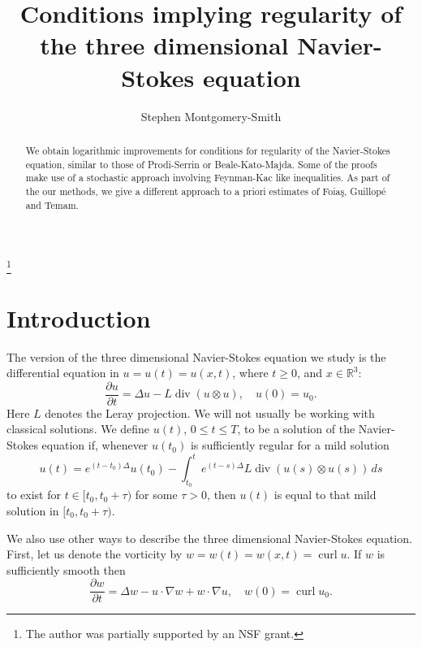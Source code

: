 \documentclass[12pt]{amsart}
\theoremstyle{remark}
\newcommand{\R}{{\mathbb R}}
\DeclareMathOperator{\curl}{curl}
\DeclareMathOperator{\divergence}{div}
\begin{document}
\title[Regularity of Navier-Stokes]
{Conditions implying regularity of the three dimensional Navier-Stokes
equation}
\author{Stephen Montgomery-Smith}
\makeatletter
\address{Department of Mathematics,
University of Missouri,
Columbia, MO 65211}
\thanks{The author was
partially supported
by an NSF grant.}

\begin{abstract}
We obtain logarithmic improvements for 
conditions for regularity of the
Navier-Stokes equation, similar to those of Prodi-Serrin or
Beale-Kato-Majda.  
Some of the proofs make use
of a stochastic approach involving Feynman-Kac like inequalities.
As part of the our methods, we give a different approach to a priori estimates
of Foia\c s, Guillop\'e and Temam.
\end{abstract}

\maketitle

\section{Introduction}

The version of the three dimensional
Navier-Stokes equation we study is the
differential equation in
$u = u(t) = u(x,t)$, where $ t\ge 0$, and $x \in \R^3$:
$$ \frac{\partial u}{\partial t}
   = \Delta u - L\divergence(u \otimes u),
   \quad u(0) = u_0.$$
Here $L$ denotes the Leray projection.
We will not usually be working with classical solutions.  We define
$u(t)$, $0 \le t \le T$,
to be a solution of the Navier-Stokes equation if, whenever $u(t_0)$ is 
sufficiently regular for a mild solution
$$ u(t) = e^{(t-t_0)\Delta} u(t_0) - \int_{t_0}^t
   e^{(t-s)\Delta} L\divergence(u(s) \otimes u(s)) \, ds $$   
to exist for 
$t \in [t_0,t_0+\tau)$ for some $\tau>0$, 
then $u(t)$ is equal to that mild solution in $[t_0,t_0+\tau)$.

We also use other ways to describe the three dimensional
Navier-Stokes equation.  First, let us 
denote the vorticity by $w = w(t) = w(x,t) = \curl u$.
If $w$ is sufficiently smooth then
$$ \frac{\partial w}{\partial t}
   = \Delta w - u \cdot \nabla w + w \cdot \nabla u ,
   \quad w(0) = \curl u_0 .$$
\end{document}
